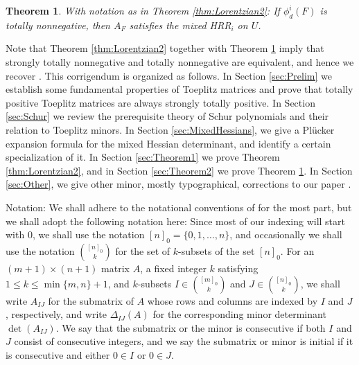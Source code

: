 \documentclass[unnumsec,webpdf,modern,medium]{oup-authoring-template}
\theoremstyle{theorem}
\newtheorem{theorem}{Theorem}[section]
\theoremstyle{definition}
\begin{document}
\begin{theorem}
	\label{thm:STN=TN}
	With notation as in Theorem \ref{thm:Lorentzian2}:
	If $\phi^i_d(F)$ is totally nonnegative, then $A_F$ satisfies the mixed HRR$_i$ on $U$.
\end{theorem}
Note that Theorem \ref{thm:Lorentzian2} together with Theorem \ref{thm:STN=TN} imply that strongly totally nonnegative and totally nonnegative are equivalent, and hence we recover \cite[Theorem 4.21]{MMS}.  
This corrigendum is organized as follows.  In Section \ref{sec:Prelim} we establish some fundamental properties of Toeplitz matrices and prove that totally positive Toeplitz matrices are always strongly totally positive.  In Section \ref{sec:Schur} we review the prerequisite theory of Schur polynomials and their relation to Toeplitz minors.  In Section \ref{sec:MixedHessians}, we give a Pl\"ucker expansion formula for the mixed Hessian determinant, and identify a certain specialization of it.  In Section \ref{sec:Theorem1} we prove Theorem \ref{thm:Lorentzian2}, and in Section \ref{sec:Theorem2} we prove Theorem \ref{thm:STN=TN}.  In Section \ref{sec:Other}, we give other minor, mostly typographical, corrections to our paper \cite{MMS}.

Notation:  We shall adhere to the notational conventions of \cite{MMS} for the most part, but we shall adopt the following notation here:  Since most of our indexing will start with $0$, we shall use the notation $[n]_0=\{0,1,\ldots,n\}$, and occasionally we shall use the notation
$\binom{[n]_0}{k}$ for the set of $k$-subsets of the set $[n]_0$.  For an $(m+1)\times (n+1)$ matrix $A$, a fixed integer $k$ satisfying $1\leq k\leq \min\{m,n\}+1$, and $k$-subsets $I\in\binom{[m]_0}{k}$ and $J\in\binom{[n]_0}{k}$, 
we shall write $A_{IJ}$ for the submatrix of $A$ whose rows and columns are indexed by \(I\) and \(J\), respectively, and write $\Delta_{IJ}(A)$ for the corresponding minor determinant $\det(A_{IJ})$.
We say that the submatrix or the minor is consecutive if both $I$ and $J$ consist of consecutive integers, and we say the submatrix or minor is initial if it is consecutive and either $0\in I$ or $0\in J$.    
\end{document}
